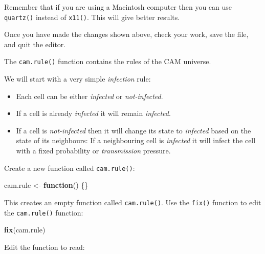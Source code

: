 \documentclass[12pt,a4paper]{book}
\newenvironment{Shaded}{\begin{snugshade}}{\end{snugshade}}
\newcommand{\ControlFlowTok}[1]{\textcolor[rgb]{0.13,0.29,0.53}{\textbf{#1}}}
\newcommand{\DecValTok}[1]{\textcolor[rgb]{0.00,0.00,0.81}{#1}}
\newcommand{\KeywordTok}[1]{\textcolor[rgb]{0.13,0.29,0.53}{\textbf{#1}}}
\newcommand{\NormalTok}[1]{#1}
\newcommand{\OperatorTok}[1]{\textcolor[rgb]{0.81,0.36,0.00}{\textbf{#1}}}
\newcommand{\StringTok}[1]{\textcolor[rgb]{0.31,0.60,0.02}{#1}}
\theoremstyle{definition}
\theoremstyle{definition}
\theoremstyle{definition}
\theoremstyle{remark}
\begin{document}
Remember that if you are using a Macintosh computer then you can use
\texttt{quartz()} instead of \texttt{x11()}. This will give better
results.

Once you have made the changes shown above, check your work, save the
file, and quit the editor.

The \texttt{cam.rule()} function contains the rules of the CAM universe.

We will start with a very simple \emph{infection} rule:

\begin{itemize}
\item
  Each cell can be either \emph{infected} or \emph{not-infected}.
\item
  If a cell is already \emph{infected} it will remain \emph{infected}.
\item
  If a cell is \emph{not-infected} then it will change its state to
  \emph{infected} based on the state of its neighbours: If a
  neighbouring cell is \emph{infected} it will infect the cell with a
  fixed probability or \emph{transmission} pressure.
\end{itemize}

Create a new function called \texttt{cam.rule()}:

\begin{Shaded}
\begin{Highlighting}[]
\NormalTok{cam.rule <-}\StringTok{ }\ControlFlowTok{function}\NormalTok{() \{\}}
\end{Highlighting}
\end{Shaded}

This creates an empty function called \texttt{cam.rule()}. Use the
\texttt{fix()} function to edit the \texttt{cam.rule()} function:

\begin{Shaded}
\begin{Highlighting}[]
\KeywordTok{fix}\NormalTok{(cam.rule)}
\end{Highlighting}
\end{Shaded}

Edit the function to read:

\begin{Shaded}
\end{Shaded}
\end{document}
